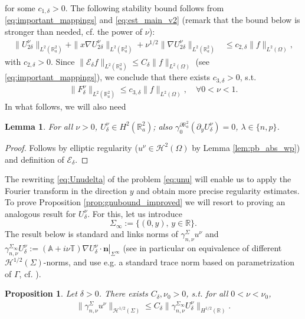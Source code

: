\documentclass[report]{elsarticle}
\newtheorem{proposition}[theorem]{Proposition}
\newtheorem{lemma}[theorem]{Lemma}
\numberwithin{theorem}{section}
\renewcommand{\vec}[1]{\mathbf{#1}}
\begin{document}
for some $c_{1,\delta}>0$.
The following stability bound follows from \eqref{eq:important_mappings} and \eqref{eq:est_main_v2} (remark that the bound below is stronger than needed, cf. the power of $\nu$):
\begin{align}
	\label{eq:stabU}
	\|U^{\nu}_{2\delta}\|_{L^2(\mathbb{R}^2_a)}+\|x\nabla U^{\nu}_{2\delta}\|_{L^2(\mathbb{R}^2_a)}+\nu^{1/2}\|\nabla U^{\nu}_{2\delta}\|_{L^2(\mathbb{R}^2_a)}&\leq   c_{2,\delta}\|f\|_{L^2(\Omega)},
\end{align}
with $c_{2,\delta}>0$. Since  $\|\mathcal{E}_{\delta}f\|_{L^2(\mathbb{R}^2_a)}\leq C_{\delta}\|f\|_{L^2(\Omega)}$ (see \eqref{eq:important_mappings}), we conclude that there exists $c_{3,\delta}>0$, s.t. 
\begin{align}
	\label{eq:stabFdelta}
	\|F^{\nu}_{\delta}\|_{L^2(\mathbb{R}^2_a)}\leq c_{3,\delta} \|f\|_{L^2(\Omega)}, \quad \forall 0<\nu<1. 
\end{align}
In what follows, we will also need  
\begin{lemma}
	\label{lem:ellreg}
	For all $\nu>0$, $U^{\nu}_{\delta}\in H^2(\mathbb{R}^2_a)$; also $\gamma_{0}^{\partial\mathbb{R}^2_a}\left(\partial_y U^{\nu}_{\delta}\right)=0$, $\lambda\in \{n,p\}$.
\end{lemma}
\begin{proof}
	Follows by elliptic regularity ($u^{\nu}\in  \mathcal{H}^2(\Omega)$ by Lemma \ref{lem:pb_abs_wp}) and definition of $\mathcal{E}_{\delta}$. 
\end{proof}
The rewriting \eqref{eq:Unudelta} of the problem \eqref{eq:unu} will enable us to apply the Fourier transform in the direction $y$ and obtain more precise regularity estimates. To prove Proposition \ref{prop:gnubound_improved} we will resort to proving an analogous result for $U^{\nu}_{\delta}$. For this, let us introduce
\begin{equation}
	\label{eq:sigmainf}
	\Sigma_{\infty}:=\{(0,y), \, y\in \mathbb{R}\}.
\end{equation}
The result below is standard and links norms of  $\gamma_{n,\nu}^{\Sigma}u^{\nu}$ and $\gamma_{n,\nu}^{\Sigma_{\infty}}U^{\nu}_{\delta}:=\left.(\mathbb{A}+i\nu\mathbb{T})\nabla U^{\nu}_{\delta}\cdot \vec{n}\right|_{\Sigma^{\infty}}$ (see in particular \cite[Theorem 4.2.1]{wendland_hsiao} on equivalence of different $\mathcal{H}^{1/2}(\Sigma)$-norms, and use e.g. a standard trace norm based on parametrization of $\Gamma$, cf. \cite[p.176]{wendland_hsiao}).   
\begin{proposition}
	\label{prop:traces}
	Let $\delta>0$. There exists $C_{\delta}, \nu_0>0$, s.t. for all $0<\nu<\nu_0$, 
	\begin{align*}	
		\|\gamma_{n,\nu}^{\Sigma}u^{\nu}\|_{\mathcal{H}^{1/2}(\Sigma)}\leq C_{\delta} \|\gamma_{n,\nu}^{\Sigma_{\infty}}U^{\nu}_{\delta}\|_{H^{1/2}(\mathbb{R})}.
	\end{align*}
\end{proposition}
\end{document}
